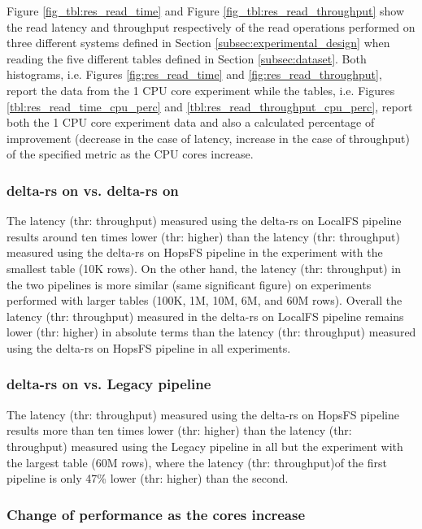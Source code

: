 Figure \ref{fig_tbl:res_read_time} and Figure \ref{fig_tbl:res_read_throughput} show the read latency and throughput respectively of the read operations performed on three different systems defined in Section \ref{subsec:experimental_design} when reading the five different tables defined in Section \ref{subsec:dataset}. Both histograms, i.e. Figures \ref{fig:res_read_time} and \ref{fig:res_read_throughput}, report the data from the 1 \gls{CPU} core experiment while the tables, i.e. Figures \ref{tbl:res_read_time_cpu_perc} and \ref{tbl:res_read_throughput_cpu_perc}, report both the 1 \gls{CPU} core experiment data and also a calculated percentage of improvement (decrease in the case of latency, increase in the case of throughput) of the specified metric as the \gls{CPU} cores increase.

\subsubsection*{delta-rs on  vs. delta-rs on }

The latency (thr: throughput) measured using the delta-rs on \gls{LocalFS} pipeline results around ten times lower (thr: higher) than the latency (thr: throughput) measured using the delta-rs on \gls{HopsFS} pipeline in the experiment with the smallest table (10K rows). On the other hand, the latency (thr: throughput) in the two pipelines is more similar (same significant figure) on experiments performed with larger tables (100K, 1M, 10M, 6M, and 60M rows). Overall the latency (thr: throughput) measured in the delta-rs on \gls{LocalFS} pipeline remains lower (thr: higher) in absolute terms than the latency (thr: throughput) measured using the delta-rs on \gls{HopsFS} pipeline in all experiments.

\subsubsection*{delta-rs on  vs. Legacy pipeline}

The latency (thr: throughput) measured using the delta-rs on \gls{HopsFS} pipeline results more than ten times lower (thr: higher) than the latency (thr: throughput) measured using the Legacy pipeline in all but the experiment with the largest table (60M rows), where the latency (thr: throughput)of the first pipeline is only 47\% lower (thr: higher) than the second. 

\subsubsection*{Change of performance as the  cores increase}

